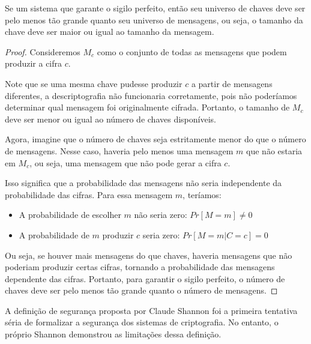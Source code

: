 \begin{theorem}[Shannon]
Se um sistema que garante o sigilo perfeito, então seu universo de chaves deve ser pelo menos tão grande quanto seu universo de mensagens, ou seja, o tamanho da chave deve ser maior ou igual ao tamanho da mensagem.
\end{theorem}
\begin{proof}
Consideremos $M_c$ como o conjunto de todas as mensagens que podem produzir a cifra $c$.

Note que se uma mesma chave pudesse produzir $c$ a partir de mensagens diferentes, a descriptografia não funcionaria corretamente, pois não poderíamos determinar qual mensagem foi originalmente cifrada.
Portanto, o tamanho de $M_c$ deve ser menor ou igual ao número de chaves disponíveis.

Agora, imagine que o número de chaves seja estritamente menor do que o número de mensagens.
Nesse caso, haveria pelo menos uma mensagem $m$ que não estaria em $M_c$, ou seja, uma mensagem que não pode gerar a cifra $c$.

Isso significa que a probabilidade das mensagens não seria independente da probabilidade das cifras. Para essa mensagem $m$, teríamos:
\begin{itemize}
\item A probabilidade de escolher $m$ não seria zero: $Pr[M = m] \neq 0$
\item A probabilidade de $m$ produzir $c$ seria zero: $Pr[M = m | C = c] = 0$
\end{itemize}

Ou seja, se houver mais mensagens do que chaves, haveria mensagens que não poderiam produzir certas cifras, tornando a probabilidade das mensagens dependente das cifras.
Portanto, para garantir o sigilo perfeito, o número de chaves deve ser pelo menos tão grande quanto o número de mensagens.
\end{proof}

A definição de segurança proposta por Claude Shannon foi a primeira tentativa séria de formalizar a segurança dos sistemas de criptografia.
No entanto, o próprio Shannon demonstrou as limitações dessa definição.

